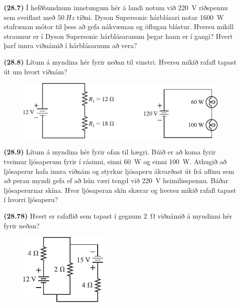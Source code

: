 \begin{enumerate}[label = \textbf{(\alph*)}]

\item[\textbf{(28.7)}] Í hefðbundnum innstungum hér á landi notum við \SI{220}{V} riðspennu sem sveiflast með $\SI{50}{Hz}$ tíðni. Dyson Supersonic hárblásari notar \SI{1600}{W} stafrænan mótor til þess að gefa nákvæman og öflugan blástur. Hversu mikill straumur er í Dyson Supersonic hárblásaranum þegar hann er í gangi? Hvert þarf innra viðnámið í hárblásarnum að vera?

\item[\textbf{(28.8)}] Lítum á myndina hér fyrir neðan til vinstri. Hversu mikið rafafl tapast út um hvort viðnám?

\begin{figure}[H]
    \centering
    \includegraphics[scale = 1.25]{figures/rk288.pdf}
\end{figure}

\item[\textbf{(28.9)}] Lítum á myndina hér fyrir ofan til hægri. Búið er að koma fyrir tveimur ljósaperum fyrir í rásinni, einni \SI{60}{W} og einni \SI{100}{W}. Athugið að ljósaperur hafa innra viðnám og styrkur ljósaperu ákvarðast út frá aflinu sem að peran myndi gefa ef að hún væri tengd við \SI{220}{V} heimilisspennu. Báðar ljósaperurnar skína. Hvor ljósaperan skín skærar og hversu mikið rafafl tapast í hvorri ljósaperu?

\item[\textbf{(28.78)}] Hvert er rafaflið sem tapast í gegnum \SI{2}{\ohm} viðnámið á myndinni hér fyrir neðan?

\begin{figure}[H]
    \centering
    \includegraphics[scale = 1.25]{figures/rk2873.pdf}
\end{figure}

\end{enumerate}

